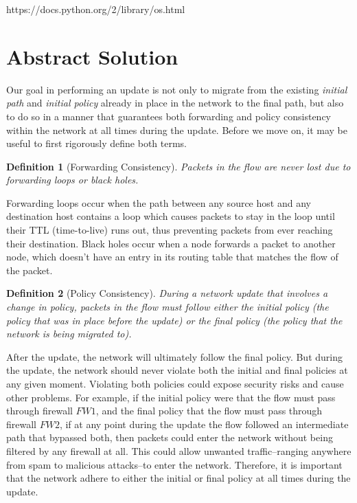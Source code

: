 \documentclass[pageno]{jpaper}
\newtheorem{defi}{Definition}
\begin{document}
https://docs.python.org/2/library/os.html



\section{Abstract Solution}
\label{sec:solution}
Our goal in performing an update is not only to migrate from the existing \textit{initial path} and \textit{initial policy} already in place in the network to the final path, but also to do so in a manner that guarantees both forwarding and policy consistency within the network at all times during the update. Before we move on, it may be useful to first rigorously define both terms.

\begin{defi}[Forwarding Consistency]
Packets in the flow are never lost due to forwarding loops or black holes.
\end{defi}

Forwarding loops occur when the path between any source host and any destination host contains a loop which causes packets to stay in the loop until their TTL (time-to-live) runs out, thus preventing packets from ever reaching their destination. Black holes occur when a node forwards a packet to another node, which doesn’t have an entry in its routing table that matches the flow of the packet.

\begin{defi}[Policy Consistency]
During a network update that involves a change in policy, packets in the flow must follow either the initial policy (the policy that was in place before the update) or the final policy (the policy that the network is being migrated to).
\end{defi}

After the update, the network will ultimately follow the final policy. But during the update, the network should never violate both the initial and final policies at any given moment. Violating both policies could expose security risks and cause other problems. For example, if the initial policy were that the flow must pass through firewall $FW1$, and the final policy that the flow must pass through firewall $FW2$, if at any point during the update the flow followed an intermediate path that bypassed both, then packets could enter the network without being filtered by any firewall at all. This could allow unwanted traffic--ranging anywhere from spam to malicious attacks--to enter the network. Therefore, it is important that the network adhere to either the initial or final policy at all times during the update. \\
\end{document}
